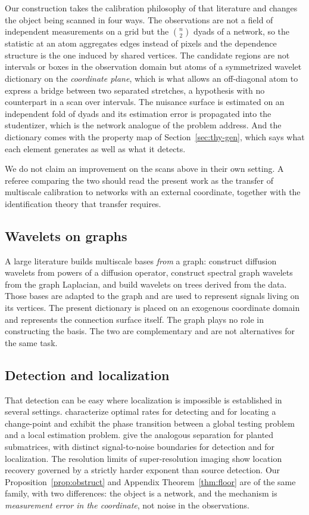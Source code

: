 \documentclass[11pt]{article}
\theoremstyle{definition}
\newcommand{\1}{\mathbf 1}\newcommand{\op}{\operatorname}
\begin{document}
Our construction takes the calibration philosophy of that literature and
changes the object being scanned in four ways.  The observations are not a
field of independent measurements on a grid but the $\binom n2$ dyads of a
network, so the statistic at an atom aggregates edges instead of pixels and
the dependence structure is the one induced by shared vertices.  The candidate
regions are not intervals or boxes in the observation domain but atoms of a
symmetrized wavelet dictionary on the \emph{coordinate plane}, which is what
allows an off-diagonal atom to express a bridge between two separated
stretches, a hypothesis with no counterpart in a scan over intervals.  The
nuisance surface is estimated on an independent fold of dyads and its
estimation error is propagated into the studentizer, which is the network
analogue of the problem \citet{koenigJRSSB} address.  And the dictionary comes
with the property map of Section~\ref{sec:thy-gen}, which says what each
element generates as well as what it detects.

We do not claim an improvement on the scans above in their own setting.  A
referee comparing the two should read the present work as the transfer of
multiscale calibration to networks with an external coordinate, together with
the identification theory that transfer requires.

\subsection{Wavelets on graphs}

A large literature builds multiscale bases \emph{from} a graph:
\citet{coifman2006} construct diffusion wavelets from powers of a diffusion
operator, \citet{hammond2011} construct spectral graph wavelets from the graph
Laplacian, and \citet{gavish2010} build wavelets on trees derived from the
data.  Those bases are adapted to the graph and are used to represent signals
living on its vertices.  The present dictionary is placed on an exogenous
coordinate domain and represents the connection surface itself.  The graph
plays no role in constructing the basis.  The two are complementary and are
not alternatives for the same task.

\subsection{Detection and localization}

That detection can be easy where localization is impossible is established in
several settings.  \citet{verzelen2023} characterize optimal rates for
detecting and for locating a change-point and exhibit the phase transition
between a global testing problem and a local estimation problem.
\citet{cai2017} give the analogous separation for planted submatrices, with
distinct signal-to-noise boundaries for detection and for localization.  The
resolution limits of super-resolution imaging show location recovery
governed by a strictly harder exponent than source detection.  Our
Proposition~\ref{prop:obstruct} and Appendix Theorem~\ref{thm:floor} are of the same
family, with two differences: the object is a network, and the mechanism is
\emph{measurement error in the coordinate}, not noise in the
observations.
\end{document}
